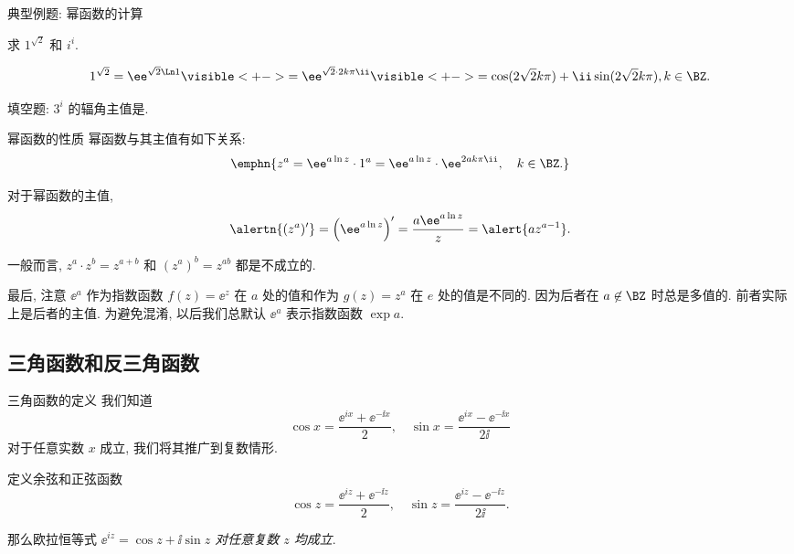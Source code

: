 \begin{frame}{典型例题: 幂函数的计算}
	\onslide<+->
	\begin{example}
		求 $1^{\sqrt 2}$ 和 $i^i$.
	\end{example}
	\onslide<+->
	\begin{solution}
	\[
			1^{\sqrt2}=\ee^{\sqrt2\Ln1}
			\visible<+->{=\ee^{\sqrt 2\cdot 2k\pi\ii}}
			\visible<+->{=\cos(2\sqrt 2k\pi)+\ii\sin(2\sqrt 2k\pi), k\in\BZ.}
	\]
		\onslide<+->{%
	\[
			i^i=\ee^{\ii\Ln i}
			\visible<+->{=\exp\left[i\cdot\Bigl(2k+\half\Bigr)\pi\ii\right]}
			\visible<+->{=\exp\Bigl(-2k\pi-\half\pi\Bigr), k\in\BZ.}\]}
		\vspace{-\baselineskip}
	\end{solution}
	\onslide<+->
	\begin{exercise}
		填空题: $3^i$ 的辐角主值是.
	\end{exercise}
\end{frame}


\begin{frame}{幂函数的性质}
	幂函数与其主值有如下关系:
	\onslide<+->
	\[\emphn{z^a=\ee^{a\ln z}\cdot 1^a
	=\ee^{a\ln z}\cdot \ee^{2ak\pi\ii},\quad k\in\BZ.}
	\]

	\onslide<+->
	对于幂函数的主值,
	\[\alertn{(z^a)'}=\Bigl(\ee^{a\ln z}\Bigr)'=\frac{a\ee^{a\ln z}}z=\alert{az^{a-1}}.
	\]

	\onslide<+->
	一般而言, $z^a\cdot z^b=z^{a+b}$ 和 $(z^a)^b=z^{ab}$ 都是不成立的.

	\onslide<+->
	最后, 注意 $\ee^a$ 作为指数函数 $f(z)=\ee^z$ 在 $a$ 处的值和作为 $g(z)=z^a$ 在 $e$ 处的值是\alert{不同}的.
	\onslide<+->
	因为后者在 $a\not\in\BZ$ 时总是多值的.
	\onslide<+->
	前者实际上是后者的主值.
	\onslide<+->
	为避免混淆, 以后我们总\alert{默认 $\ee^a$ 表示指数函数 $\exp a$}.
\end{frame}


\subsection{三角函数和反三角函数}

\begin{frame}{三角函数的定义}
	\onslide<+->
	我们知道
	\[\cos x=\frac{\ee^{ix}+\ee^{-\ii x}}2,\quad
	\sin x=\frac{\ee^{ix}-\ee^{-\ii x}}{2\ii}
	\]
	对于任意实数 $x$ 成立,
	\onslide<+->
	我们将其推广到复数情形.
	\onslide<+->
	\begin{definition}
		定义余弦和正弦函数
	\[
		\displaystyle\cos z=\frac{\ee^{iz}+\ee^{-\ii z}}2,\quad
		\sin z=\frac{\ee^{iz}-\ee^{-\ii z}}{2\ii}.
	\]
	\end{definition}

	\onslide<+->
	那么欧拉恒等式 \emph{$\ee^{iz}=\cos z+\ii\sin z$ 对任意复数 $z$ 均成立}.
\end{frame}


